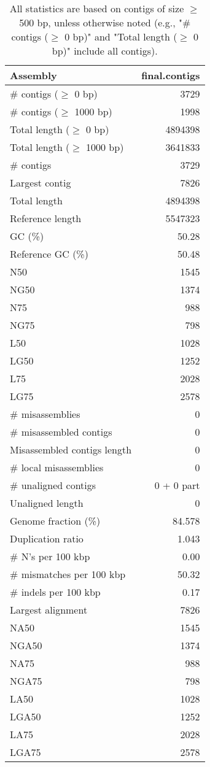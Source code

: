 \documentclass[12pt,a4paper]{article}
\begin{document}
\begin{table}[ht]
\begin{center}
\caption{All statistics are based on contigs of size $\geq$ 500 bp, unless otherwise noted (e.g., "\# contigs ($\geq$ 0 bp)" and "Total length ($\geq$ 0 bp)" include all contigs).}
\begin{tabular}{|l*{1}{|r}|}
\hline
Assembly & final.contigs \\ \hline
\# contigs ($\geq$ 0 bp) & 3729 \\ \hline
\# contigs ($\geq$ 1000 bp) & 1998 \\ \hline
Total length ($\geq$ 0 bp) & 4894398 \\ \hline
Total length ($\geq$ 1000 bp) & 3641833 \\ \hline
\# contigs & 3729 \\ \hline
Largest contig & 7826 \\ \hline
Total length & 4894398 \\ \hline
Reference length & 5547323 \\ \hline
GC (\%) & 50.28 \\ \hline
Reference GC (\%) & 50.48 \\ \hline
N50 & 1545 \\ \hline
NG50 & 1374 \\ \hline
N75 & 988 \\ \hline
NG75 & 798 \\ \hline
L50 & 1028 \\ \hline
LG50 & 1252 \\ \hline
L75 & 2028 \\ \hline
LG75 & 2578 \\ \hline
\# misassemblies & 0 \\ \hline
\# misassembled contigs & 0 \\ \hline
Misassembled contigs length & 0 \\ \hline
\# local misassemblies & 0 \\ \hline
\# unaligned contigs & 0 + 0 part \\ \hline
Unaligned length & 0 \\ \hline
Genome fraction (\%) & 84.578 \\ \hline
Duplication ratio & 1.043 \\ \hline
\# N's per 100 kbp & 0.00 \\ \hline
\# mismatches per 100 kbp & 50.32 \\ \hline
\# indels per 100 kbp & 0.17 \\ \hline
Largest alignment & 7826 \\ \hline
NA50 & 1545 \\ \hline
NGA50 & 1374 \\ \hline
NA75 & 988 \\ \hline
NGA75 & 798 \\ \hline
LA50 & 1028 \\ \hline
LGA50 & 1252 \\ \hline
LA75 & 2028 \\ \hline
LGA75 & 2578 \\ \hline
\end{tabular}
\end{center}
\end{table}
\end{document}

